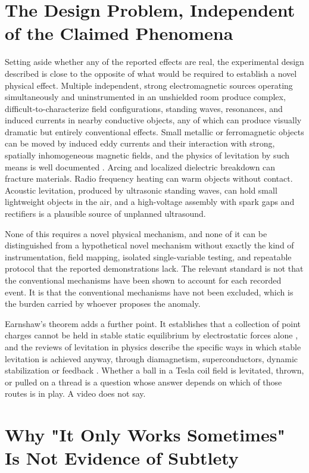 \documentclass[11pt]{article}
\begin{document}
\section{The Design Problem, Independent of the Claimed Phenomena}

Setting aside whether any of the reported effects are real, the experimental design described is close to the opposite of what would be required to establish a novel physical effect. Multiple independent, strong electromagnetic sources operating simultaneously and uninstrumented in an unshielded room produce complex, difficult-to-characterize field configurations, standing waves, resonances, and induced currents in nearby conductive objects, any of which can produce visually dramatic but entirely conventional effects. Small metallic or ferromagnetic objects can be moved by induced eddy currents and their interaction with strong, spatially inhomogeneous magnetic fields, and the physics of levitation by such means is well documented \cite{B1989}. Arcing and localized dielectric breakdown can fracture materials. Radio frequency heating can warm objects without contact. Acoustic levitation, produced by ultrasonic standing waves, can hold small lightweight objects in the air, and a high-voltage assembly with spark gaps and rectifiers is a plausible source of unplanned ultrasound.

None of this requires a novel physical mechanism, and none of it can be distinguished from a hypothetical novel mechanism without exactly the kind of instrumentation, field mapping, isolated single-variable testing, and repeatable protocol that the reported demonstrations lack. The relevant standard is not that the conventional mechanisms have been shown to account for each recorded event. It is that the conventional mechanisms have not been excluded, which is the burden carried by whoever proposes the anomaly.

Earnshaw's theorem adds a further point. It establishes that a collection of point charges cannot be held in stable static equilibrium by electrostatic forces alone \cite{E1842}, and the reviews of levitation in physics describe the specific ways in which stable levitation is achieved anyway, through diamagnetism, superconductors, dynamic stabilization or feedback \cite{B1989}. Whether a ball in a Tesla coil field is levitated, thrown, or pulled on a thread is a question whose answer depends on which of those routes is in play. A video does not say.

\section{Why "It Only Works Sometimes" Is Not Evidence of Subtlety}
\end{document}
